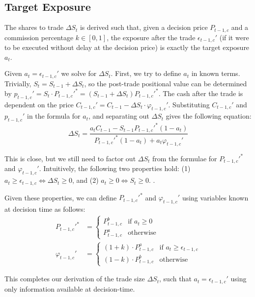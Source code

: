 
\subsection{Target Exposure}
The shares to trade $\Delta S_t$ is derived such that, given a decision price $P_{t-1,c}$ and a commission percentage $k \in [0, 1]$, the exposure after the trade $\epsilon_{t-1,c}'$ (if it were to be executed without delay at the decision price) is exactly the target exposure $a_t$.

Given $a_t = \epsilon_{t-1,c}'$ we solve for $\Delta S_t$. First, we try to define $a_t$ in known terms. Trivially, $S_t = S_{t-1} + \Delta S_t$, so the post-trade positional value can be determined by $p_{t-1,c}' = S_t \cdot P_{t-1,c}'^*=(S_{t-1} + \Delta S_t)P_{t-1,c}'^*$. The cash after the trade is dependent on the price $C_{t-1,c}'=C_{t-1}-\Delta S_t\cdot \varphi_{t-1,c}'$. Substituting $C_{t-1,c}'$ and $p_{t-1,c}'$ in the formula for $a_t$, and separating out $\Delta S_t$ gives the following equation:
$$
\Delta S_t = \frac{a_t C_{t-1} - S_{t-1}P_{t-1,c}'^* (1-a_t)}{P_{t-1,c}'^*(1-a_t) + a_t \varphi_{t-1,c}'}
$$

This is close, but we still need to factor out $\Delta S_t$ from the formulae for $P_{t-1,c}'^*$ and $\varphi_{t-1,c}'$. Intuitively, the following two properties hold: (1) $a_t \ge \epsilon_{t-1,c} \iff \Delta S_t \ge 0$, and (2) $a_t \ge 0 \iff S_t \ge 0$. . 

Given these properties, we can define $P_{t-1,c}'^*$ and $\varphi_{t-1,c}'$ using variables known at decision time as follows:
\begin{align*}
P_{t-1,c}'^* &= \begin{cases} 
P_{t-1,c}^b & \text{if } a_t \ge 0 \\ 
P_{t-1,c}^a & \text{otherwise} 
\end{cases} \\
\varphi_{t-1,c}' &= \begin{cases} 
(1+k) \cdot P_{t-1,c}^a & \text{if } a_t \ge \epsilon_{t-1,c} \\ 
(1-k) \cdot P_{t-1,c}^b & \text{otherwise} 
\end{cases}
\end{align*}

This completes our derivation of the trade size $\Delta S_t$, such that $a_t = \epsilon_{t-1,c}'$ using only information available at decision-time.


